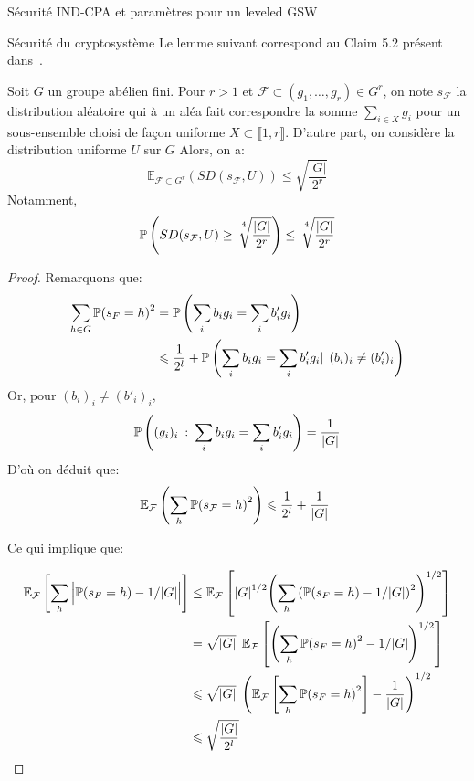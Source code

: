 \begin{section}{Sécurité IND-CPA et paramètres pour un leveled GSW}
\begin{subsection}{Sécurité du cryptosystème}
	Le lemme suivant correspond au Claim 5.2 présent dans~\cite{STOC:Regev05}.

	\begin{lemme}
	Soit $G$ un groupe abélien fini. Pour $r > 1$ et 
	$\mathcal{F} \subset (g_1, \ldots, g_r) \in G^r$, on
	note
	 $s_\mathcal{F}$ la distribution aléatoire qui à un aléa
	 fait correspondre la somme $\sum_{i\in X} g_i$ pour un
	 sous-ensemble choisi de façon uniforme  $X\subset \llbracket
	 1, r \rrbracket$. 
	 D'autre part, on considère la distribution uniforme
	 $U$ sur $G$
	 Alors, on a: 
	 \[\mathbb{E}_{\mathcal{F}\subset G^r}(SD(s_\mathcal{F},U)) \leqslant
	   \sqrt{\frac{|G|}{2^r}}\]
	 Notamment, 
	 \[\mathbb{P}\left(SD(s_\mathcal{F},U) \geq
		 \sqrt[\leftroot{-3}\uproot{8}4\:]{\frac{|G|}{2^r}} \right) \leq
		 \sqrt[\leftroot{-3}\uproot{8}4\:]{\frac{|G|}{2^r}}
	 \]
	\end{lemme}
	\begin{proof}
		Remarquons que:
	\begin{align*}
		\sum_{h\in G} {\mathbb{P}(s_F = h)}^2 &= 
		\mathbb{P}\left(\sum_i b_i g_i = \sum_i b'_i g_i\right) \\
		& \leqslant \frac{1}{2^l} + \mathbb{P}
		\left( \sum_i b_i g_i = \sum_i b'_i g_i |\:\: (b_i)_i \neq
		(b'_i)_i \right)
	\end{align*}
	Or, pour $(b_i)_i \neq (b'_i)_i$, 
		\[ \mathbb{P}\left((g_i)_i\: :\: \sum_i b_i g_i = \sum_i b'_i
		g_i\right) = \frac{1}{|G|}\]
	D'où on déduit que:
	\[\mathbb{E}_\mathcal{F}\left(\sum_h {\PP(s_{\mathcal{F}} =
	h)}^2\right) \leqslant \frac{1}{2^l} + \frac{1}{|G|} \]

	Ce qui implique que:

\begin{align*}
\mathbb{E}_\mathcal{F}\left[ \sum_h\Big| \mathbb{P}(s_F = h) - 1/|G|\Big| \right] 
&\leq
\mathbb{E}_\mathcal{F}
\left[ 
	{|G|}^{1/2}
	{ \left( \sum_h {\left(\mathbb{P}(s_F = h) - 1/|G|\right)}^2
	\right)}^{1/2}
\right] 
\\
&= \sqrt{|G|} \:\:
\mathbb{E}_\mathcal{F}
	\left[ 
	{\left( \sum_h {\mathbb{P}(s_F = h)}^2 - 1/|G|\right)}^{1/2} 
	\right] \\
&\leqslant \sqrt{|G|} \:\:
{\left( 
	\mathbb{E}_\mathcal{F}\left[ \sum_h  {\mathbb{P}(s_F = h)}^2  \right]
- \frac{1}{|G|}
\right)}^{1/2} \\
	&\leqslant \sqrt{\frac{|G|}{2^l}}
\end{align*}

\end{proof}


\end{subsection}
\end{section}
